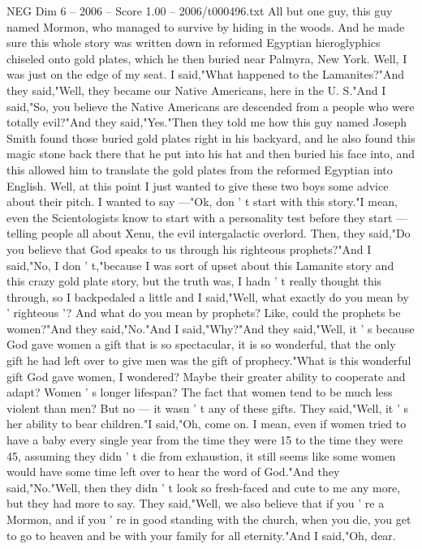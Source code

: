 \begin{textsample}{NEG Dim 6 – 2006 – Score 1.00 – 2006/t000496.txt}
All but one guy, this guy named Mormon, who managed to survive by hiding in the woods.
And he made sure this whole story was written down in reformed Egyptian hieroglyphics chiseled onto gold plates, which he then buried near Palmyra, New York.
Well, I was just on the edge of my seat.
I said,"What happened to the Lamanites?"And they said,"Well, they became our Native Americans, here in the U.
S."And I said,"So, you believe the Native Americans are descended from a people who were totally evil?"And they said,"Yes."Then they told me how this guy named Joseph Smith found those buried gold plates right in his backyard, and he also found this magic stone back there that he put into his hat and then buried his face into, and this allowed him to translate the gold plates from the reformed Egyptian into English.
Well, at this point I just wanted to give these two boys some advice about their pitch.
I wanted to say —"Ok, don ' t start with this story."I mean, even the Scientologists know to start with a personality test before they start — telling people all about Xenu, the evil intergalactic overlord.
Then, they said,"Do you believe that God speaks to us through his righteous prophets?"And I said,"No, I don ' t,"because I was sort of upset about this Lamanite story and this crazy gold plate story, but the truth was, I hadn ' t really thought this through, so I backpedaled a little and I said,"Well, what exactly do you mean by ' righteous '?
And what do you mean by prophets?
Like, could the prophets be women?"And they said,"No."And I said,"Why?"And they said,"Well, it ' s because God gave women a gift that is so spectacular, it is so wonderful, that the only gift he had left over to give men was the gift of prophecy."What is this wonderful gift God gave women, I wondered?
Maybe their greater ability to cooperate and adapt?
Women ' s longer lifespan?
The fact that women tend to be much less violent than men?
But no — it wasn ' t any of these gifts.
They said,"Well, it ' s her ability to bear children."I said,"Oh, come on.
I mean, even if women tried to have a baby every single year from the time they were 15 to the time they were 45, assuming they didn ' t die from exhaustion, it still seems like some women would have some time left over to hear the word of God."And they said,"No."Well, then they didn ' t look so fresh-faced and cute to me any more, but they had more to say.
They said,"Well, we also believe that if you ' re a Mormon, and if you ' re in good standing with the church, when you die, you get to go to heaven and be with your family for all eternity."And I said,"Oh, dear.

\end{textsample}
